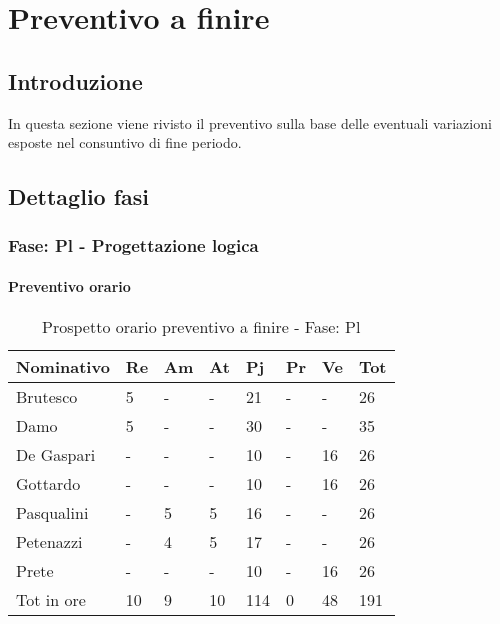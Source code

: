 \section {Preventivo a finire}
	\subsection {Introduzione}
	In questa sezione viene rivisto il preventivo sulla base delle eventuali variazioni esposte nel consuntivo di fine periodo.
	\subsection {Dettaglio fasi}
		\subsubsection {Fase: Pl - Progettazione logica}
			\paragraph{Preventivo orario}

							\begin{table}[H] \begin{center} \begin{tabular}{llllllll}
							\toprule
							\textbf{Nominativo}	&	\textbf{Re}	&	\textbf{Am}	&	\textbf{At}	&	\textbf{Pj}	&	\textbf{Pr}	&	\textbf{Ve}	&	\textbf{Tot}	 \\
							\midrule
							Brutesco	&	5	&	-	&	-	&	21	&	-	&	-	&	26	 \\
							Damo	&	5	&	-	&	-	&	30	&	-	&	-	&	35	 \\
							De Gaspari	&	-	&	-	&	-	&	10	&	-	&	16	&	26	 \\
							Gottardo	&	-	&	-	&	-	&	10	&	-	&	16	&	26	 \\
							Pasqualini	&	-	&	5	&	5	&	16	&	-	&	-	&	26	 \\
							Petenazzi	&	-	&	4	&	5	&	17	&	-	&	-	&	26	 \\
							Prete	&	-	&	-	&	-	&	10	&	-	&	16	&	26	 \\
							\midrule
							Tot in ore	&	10	&	9	&	10	&	114	&	0	&	48	&	191	 \\

							\bottomrule
							\end{tabular} \end{center} \caption{Prospetto orario preventivo a finire - Fase:
							Pl
							} \end{table}


